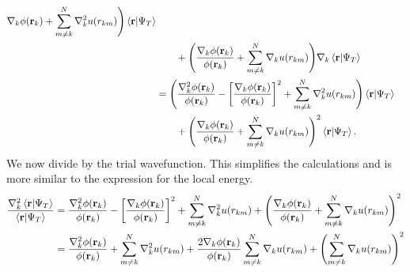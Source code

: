 \documentclass[
    a4paper, aps, twocolumn, floatfix, superscriptaddress]{revtex4-1}
\newcommand{\vf}{\mathbf}
\newcommand{\1}{\mathds{1}}
\begin{document}
\begin{widetext}
\begin{align}
                        \nabla_k\phi(\vf{r}_k)
                        +
                        \sum_{m \neq k}^N\nabla_k^2 u(r_{km})
                    \Biggr)
                    \bra{\vf{r}}\ket{\Psi_T}
                    \\
                    &\qquad
                    +
                    \Biggl(
                        \frac{\nabla_k\phi(\vf{r}_k)}{\phi(\vf{r}_k)}
                        +
                        \sum_{m \neq k}^N\nabla_k u(r_{km})
                    \Biggr)
                    \nabla_k\bra{\vf{r}}\ket{\Psi_T} \\
                    &=
                    \Biggl(
                        \frac{\nabla_k^2\phi(\vf{r}_k)}{\phi(\vf{r}_k)}
                        - \left[
                            \frac{\nabla_k\phi(\vf{r}_k)}{\phi(\vf{r}_k)}
                        \right]^2
                        +
                        \sum_{m \neq k}^N\nabla_k^2 u(r_{km})
                    \Biggr)
                    \bra{\vf{r}}\ket{\Psi_T}
                    \\
                    &\qquad
                    +
                    \Biggl(
                        \frac{\nabla_k\phi(\vf{r}_k)}{\phi(\vf{r}_k)}
                        +
                        \sum_{m \neq k}^N\nabla_k u(r_{km})
                    \Biggr)^2
                    \bra{\vf{r}}\ket{\Psi_T}.
                \end{align}
                We now divide by the trial wavefunction. This simplifies the
                calculations and is more similar to the expression for the local
                energy.
                \begin{align}
                    \frac{\nabla_k^2\bra{\vf{r}}\ket{\Psi_T}}
                    {\bra{\vf{r}}\ket{\Psi_T}}
                    &=
                    \frac{\nabla_k^2\phi(\vf{r}_k)}{\phi(\vf{r}_k)}
                    - \left[
                        \frac{\nabla_k\phi(\vf{r}_k)}{\phi(\vf{r}_k)}
                    \right]^2
                    +
                    \sum_{m \neq k}^N\nabla_k^2 u(r_{km})
                    +
                    \Biggl(
                        \frac{\nabla_k\phi(\vf{r}_k)}{\phi(\vf{r}_k)}
                        +
                        \sum_{m \neq k}^N\nabla_k u(r_{km})
                    \Biggr)^2 \\
                    &=
                    \frac{\nabla_k^2\phi(\vf{r}_k)}{\phi(\vf{r}_k)}
                    +
                    \sum_{m \neq k}^N\nabla_k^2 u(r_{km})
                    +
                    \frac{2\nabla_k\phi(\vf{r}_k)}{\phi(\vf{r}_k)}
                    \sum_{m \neq k}^N\nabla_k u(r_{km})
                    +
                    \Biggl(
                        \sum_{m \neq k}^N\nabla_k u(r_{km})
                    \Biggr)^2
                \end{align}
            \end{widetext}
\end{document}
